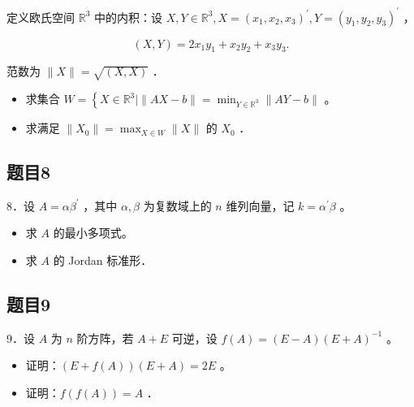 \documentclass{article}
\begin{document}
定义欧氏空间 \(\mathbb{R}^{3}\) 中的内积：设 \(X, Y \in \mathbb{R}^{3}, X=\left(x_{1}, x_{2}, x_{3}\right)^{\prime}, Y=\left(y_{1}, y_{2}, y_{3}\right)^{\prime}\) ，

\[
(X, Y)=2 x_{1} y_{1}+x_{2} y_{2}+x_{3} y_{3} .
\]

范数为 \(\|X\|=\sqrt{(X, X)}\) ．

\begin{itemize}
  \item[（1）] 求集合 \(W=\left\{X \in \mathbb{R}^{3} \mid\|A X-b\|=\min _{Y \in \mathbb{R}^{3}}\|A Y-b\|\right.\) 。
  \item[（2）] 求满足 \(\left\|X_{0}\right\|=\max _{X \in W}\|X\|\) 的 \(X_{0}\) ．
\end{itemize}

\subsection{题目8}
8．设 \(A=\alpha \beta^{\prime}\) ，其中 \(\alpha, \beta\) 为复数域上的 \(n\) 维列向量，记 \(k=\alpha^{\prime} \beta\) 。

\begin{itemize}
  \item[（1）] 求 \(A\) 的最小多项式。
  \item[（2）] 求 \(A\) 的 Jordan 标准形．
\end{itemize}

\subsection{题目9}
9．设 \(A\) 为 \(n\) 阶方阵，若 \(A+E\) 可逆，设 \(f(A)=(E-A)(E+A)^{-1}\) 。

\begin{itemize}
  \item[（1）] 证明：\((E+f(A))(E+A)=2 E\) 。
  \item[（2）] 证明：\(f(f(A))=A\) ．
\end{itemize}
\end{document}
